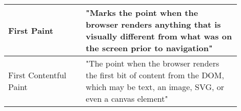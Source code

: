 



\begin{center}
\small
	\begin{tabular}{ | p{0.3\linewidth} | p{0.6\linewidth} | }
	\hline
	First Paint & "Marks the point when the browser renders anything that is visually different from what was on the screen prior to navigation"  \\ 
	\hline
	First Contentful Paint & "The point when the browser renders the first bit of content from the DOM, which may be text, an image, SVG, or even a canvas element" \\  
	\hline
	\end{tabular}
\end{center}





















